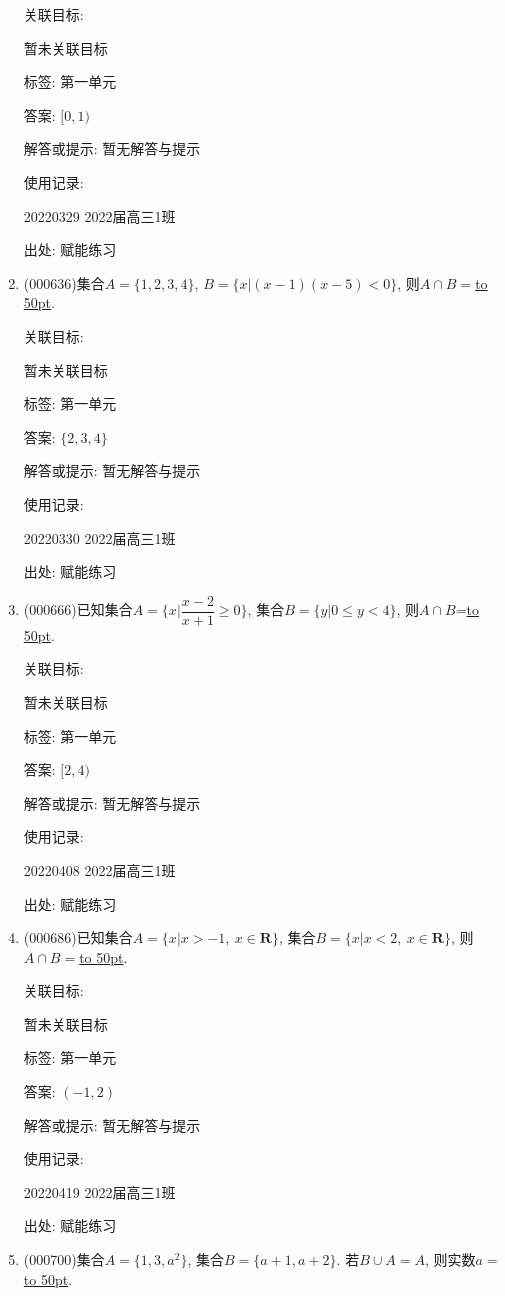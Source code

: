 \documentclass[10pt,a4paper]{article}
\newcommand{\blank}[1]{\underline{\hbox to #1pt{}}}
\begin{document}
\begin{enumerate}[1.]
关联目标:

暂未关联目标



标签: 第一单元

答案: $[0,1)$

解答或提示: 暂无解答与提示

使用记录:

20220329	2022届高三1班	


出处: 赋能练习
\item { (000636)}集合$A=\{1,2,3,4\}$, $B=\{x|(x-1)(x-5)<0\}$, 则$A\cap B=$\blank{50}.


关联目标:

暂未关联目标



标签: 第一单元

答案: $\{2,3,4\}$

解答或提示: 暂无解答与提示

使用记录:

20220330	2022届高三1班	


出处: 赋能练习
\item { (000666)}已知集合$A=\{x|\dfrac{x-2}{x+1}\ge 0\}$, 集合$B=\{y|0 \le y<4\}$, 则$A\cap B$=\blank{50}.


关联目标:

暂未关联目标



标签: 第一单元

答案: $[2,4)$

解答或提示: 暂无解答与提示

使用记录:

20220408	2022届高三1班	


出处: 赋能练习
\item { (000686)}已知集合$A=\{x|x>-1, \ x\in \mathbf{R}\}$, 集合$B=\{x|x<2, \ x\in \mathbf{R}\}$, 则$A\cap B=$\blank{50}.


关联目标:

暂未关联目标



标签: 第一单元

答案: $(-1,2)$

解答或提示: 暂无解答与提示

使用记录:

20220419	2022届高三1班	


出处: 赋能练习
\item { (000700)}集合$A=\{1,3,a^2\}$, 集合$B=\{a+1,a+2\}$. 若$B\cup A=A$, 则实数$a=$\blank{50}.



\end{enumerate}
\end{document}
